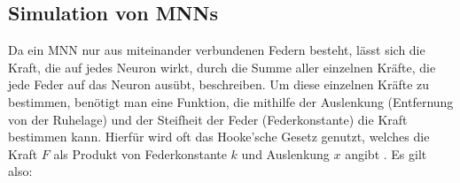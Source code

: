 





\subsection{Simulation von MNNs}

Da ein MNN nur aus miteinander verbundenen Federn besteht, lässt sich die Kraft, die auf jedes Neuron wirkt, durch die Summe aller einzelnen Kräfte, die jede Feder auf das Neuron ausübt, beschreiben.
Um diese einzelnen Kräfte zu bestimmen, benötigt man eine Funktion, die mithilfe der Auslenkung (Entfernung von der Ruhelage) und der Steifheit der Feder (Federkonstante) die Kraft bestimmen kann.
Hierfür wird oft das Hooke'sche Gesetz genutzt, welches die Kraft $F$ als Produkt von Federkonstante $k$ und Auslenkung $x$ angibt \cite{wiki:hooke}. Es gilt also:

